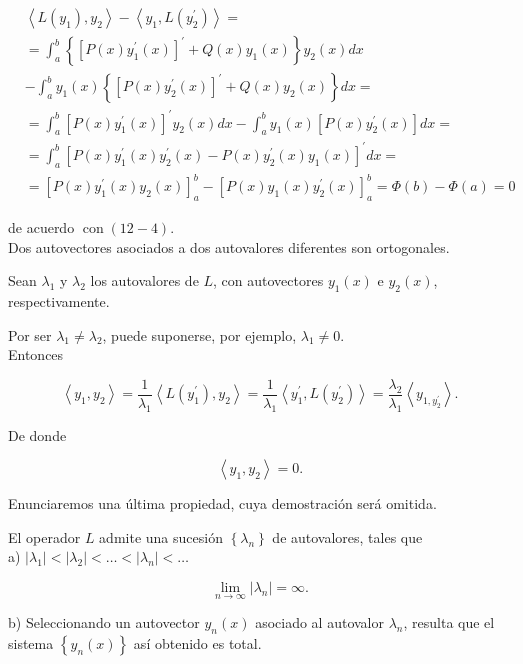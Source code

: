 \documentclass[10pt]{article}
\theoremstyle{plain}
\theoremstyle{definition}
\theoremstyle{remark}
\begin{document}
$$
\begin{aligned}
& \left\langle L\left(y_{1}\right), y_{2}\right\rangle-\left\langle y_{1}, L\left(y_{2}^{\prime}\right)\right\rangle= \\
& =\int_{a}^{b}\left\{\left[P(x) y_{1}^{\prime}(x)\right]^{\prime}+Q(x) y_{1}(x)\right\} y_{2}(x) d x \\
& -\int_{a}^{b} y_{1}(x)\left\{\left[P(x) y_{2}^{\prime}(x)\right]^{\prime}+Q(x) y_{2}(x)\right\} d x= \\
& =\int_{a}^{b}\left[P(x) y_{1}^{\prime}(x)\right]^{\prime} y_{2}(x) d x-\int_{a}^{b} y_{1}(x)\left[P(x) y_{2}^{\prime}(x)\right] d x= \\
& =\int_{a}^{b}\left[P(x) y_{1}^{\prime}(x) y_{2}^{\prime}(x)-P(x) y_{2}^{\prime}(x) y_{1}(x)\right]^{\prime} d x= \\
& =\left[P(x) y_{1}^{\prime}(x) y_{2}(x)\right]_{a}^{b}-\left[P(x) y_{1}(x) y_{2}^{\prime}(x)\right]_{a}^{b}=\Phi(b)-\Phi(a)=0
\end{aligned}
$$

de acuerdo $\operatorname{con}(12-4)$.\\
Dos autovectores asociados a dos autovalores diferentes son ortogonales.

Sean $\lambda_{1}$ y $\lambda_{2}$ los autovalores de $L$, con autovectores $y_{1}(x)$ e $y_{2}(x)$, respectivamente.

Por ser $\lambda_{1} \neq \lambda_{2}$, puede suponerse, por ejemplo, $\lambda_{1} \neq 0$.\\
Entonces

$$
\left\langle y_{1}, y_{2}\right\rangle=\frac{1}{\lambda_{1}}\left\langle L\left(y_{1}^{\prime}\right), y_{2}\right\rangle=\frac{1}{\lambda_{1}}\left\langle y_{1}^{\prime}, L\left(y_{2}^{\prime}\right)\right\rangle=\frac{\lambda_{2}}{\lambda_{1}}\left\langle y_{1, y_{2}^{\prime}}\right\rangle .
$$

De donde


$$
\left\langle y_{1}, y_{2}\right\rangle=0 .
$$

Enunciaremos una última propiedad, cuya demostración será omitida.

El operador $L$ admite una sucesión $\left\{\lambda_{n}\right\}$ de autovalores, tales que\\
a) $\left|\lambda_{1}\right|<\left|\lambda_{2}\right|<\ldots<\left|\lambda_{n}\right|<\ldots$

$$
\lim _{n \rightarrow \infty}\left|\lambda_{n}\right|=\infty .
$$

b) Seleccionando un autovector $y_{n}(x)$ asociado al autovalor $\lambda_{n}$, resulta que el sistema $\left\{y_{n}(x)\right\}$ así obtenido es total.
\end{document}
